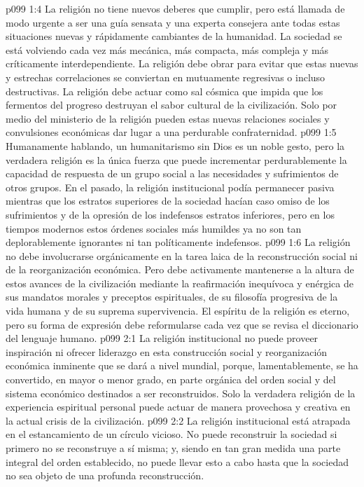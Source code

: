 \vs p099 1:4 La religión no tiene nuevos deberes que cumplir, pero está llamada de modo urgente a ser una guía sensata y una experta consejera ante todas estas situaciones nuevas y rápidamente cambiantes de la humanidad. La sociedad se está volviendo cada vez más mecánica, más compacta, más compleja y más críticamente interdependiente. La religión debe obrar para evitar que estas nuevas y estrechas correlaciones se conviertan en mutuamente regresivas o incluso destructivas. La religión debe actuar como sal cósmica que impida que los fermentos del progreso destruyan el sabor cultural de la civilización. Solo por medio del ministerio de la religión pueden estas nuevas relaciones sociales y convulsiones económicas dar lugar a una perdurable confraternidad.
\vs p099 1:5 Humanamente hablando, un humanitarismo sin Dios es un noble gesto, pero la verdadera religión es la única fuerza que puede incrementar perdurablemente la capacidad de respuesta de un grupo social a las necesidades y sufrimientos de otros grupos. En el pasado, la religión institucional podía permanecer pasiva mientras que los estratos superiores de la sociedad hacían caso omiso de los sufrimientos y de la opresión de los indefensos estratos inferiores, pero en los tiempos modernos estos órdenes sociales más humildes ya no son tan deplorablemente ignorantes ni tan políticamente indefensos.
\vs p099 1:6 La religión no debe involucrarse orgánicamente en la tarea laica de la reconstrucción social ni de la reorganización económica. Pero debe activamente mantenerse a la altura de estos avances de la civilización mediante la reafirmación inequívoca y enérgica de sus mandatos morales y preceptos espirituales, de su filosofía progresiva de la vida humana y de su suprema supervivencia. El espíritu de la religión es eterno, pero su forma de expresión debe reformularse cada vez que se revisa el diccionario del lenguaje humano.
\vs p099 2:1 La religión institucional no puede proveer inspiración ni ofrecer liderazgo en esta construcción social y reorganización económica inminente que se dará a nivel mundial, porque, lamentablemente, se ha convertido, en mayor o menor grado, en parte orgánica del orden social y del sistema económico destinados a ser reconstruidos. Solo la verdadera religión de la experiencia espiritual personal puede actuar de manera provechosa y creativa en la actual crisis de la civilización.
\vs p099 2:2 La religión institucional está atrapada en el estancamiento de un círculo vicioso. No puede reconstruir la sociedad si primero no se reconstruye a sí misma; y, siendo en tan gran medida una parte integral del orden establecido, no puede llevar esto a cabo hasta que la sociedad no sea objeto de una profunda reconstrucción.

